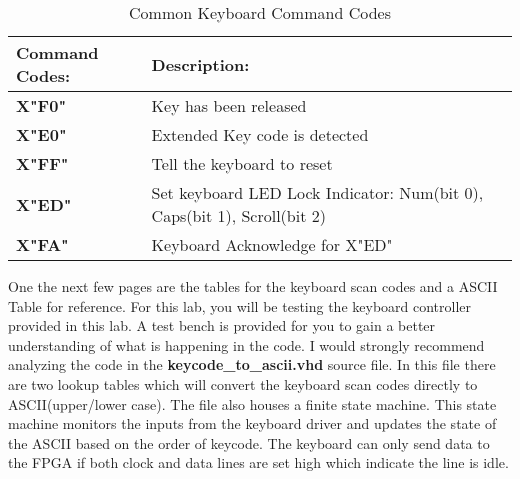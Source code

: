 \documentclass{article}
\begin{document}
\begin{table}[!htbp]
  \begin{center}
    \begin{tabular}{|l|l|}
       \hline
       \large{\textbf{Command Codes:}} & \large{\textbf{Description:}} \\
       \hline 
       \textbf{X"F0"} & Key has been released \\
       \textbf{X"E0"} & Extended Key code is detected \\
       \textbf{X"FF"} & Tell the keyboard to reset \\
       \textbf{X"ED"} & Set keyboard LED Lock Indicator: Num(bit 0), Caps(bit 1), Scroll(bit 2) \\
       \textbf{X"FA"} & Keyboard Acknowledge for X"ED" \\
       \hline
    \end{tabular}
  \end{center}
  \caption{Common Keyboard Command Codes}
\end{table}

One the next few pages are the tables for the keyboard scan codes and a ASCII Table for reference. For this lab, you will be testing the keyboard controller provided in this lab. A test bench is provided for you to gain a better understanding of what is happening in the code. I would strongly recommend analyzing the code in the \textbf{keycode\_to\_ascii.vhd} source file. In this file there are two lookup tables which will convert the keyboard scan codes directly to ASCII(upper/lower case). The file also houses a finite state machine. This state machine monitors the inputs from the keyboard driver and updates the state of the ASCII based on the order of keycode. The keyboard can only send data to the FPGA if both clock and data lines are set high which indicate the line is idle.
\end{document}
